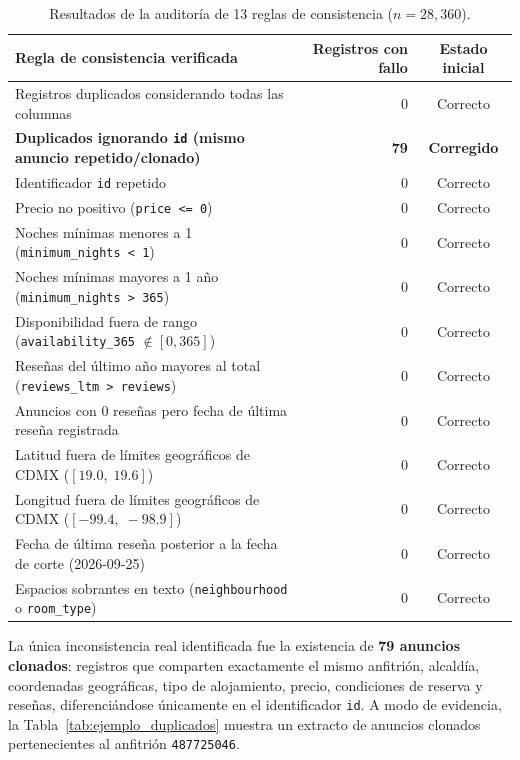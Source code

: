 \documentclass[12pt,letterpaper,oneside]{report}
\begin{document}
\begin{table}[htbp]
\centering
\caption{Resultados de la auditoría de 13 reglas de consistencia ($n = 28{,}360$).}
\label{tab:reglas_inconsistencias}
\footnotesize
\renewcommand{\arraystretch}{1.15}
\begin{tabularx}{\textwidth}{Y r c}
\toprule
{}
\textbf{Regla de consistencia verificada} & \textbf{Registros con fallo} & \textbf{Estado inicial} \\
\midrule
Registros duplicados considerando todas las columnas & 0 & Correcto \\
\textbf{Duplicados ignorando \texttt{id} (mismo anuncio repetido/clonado)} & \textbf{79} & \textbf{Corregido} \\
Identificador \texttt{id} repetido & 0 & Correcto \\
Precio no positivo (\texttt{price <= 0}) & 0 & Correcto \\
Noches mínimas menores a 1 (\texttt{minimum\_nights < 1}) & 0 & Correcto \\
Noches mínimas mayores a 1 año (\texttt{minimum\_nights > 365}) & 0 & Correcto \\
Disponibilidad fuera de rango (\texttt{availability\_365} $\notin [0, 365]$) & 0 & Correcto \\
Reseñas del último año mayores al total (\texttt{reviews\_ltm > reviews}) & 0 & Correcto \\
Anuncios con 0 reseñas pero fecha de última reseña registrada & 0 & Correcto \\
Latitud fuera de límites geográficos de CDMX ($[19.0,\; 19.6]$) & 0 & Correcto \\
Longitud fuera de límites geográficos de CDMX ($[-99.4,\; -98.9]$) & 0 & Correcto \\
Fecha de última reseña posterior a la fecha de corte (2026-09-25) & 0 & Correcto \\
Espacios sobrantes en texto (\texttt{neighbourhood} o \texttt{room\_type}) & 0 & Correcto \\
\bottomrule
\end{tabularx}
\end{table}

La única inconsistencia real identificada fue la existencia de \textbf{79 anuncios clonados}: registros que comparten exactamente el mismo anfitrión, alcaldía, coordenadas geográficas, tipo de alojamiento, precio, condiciones de reserva y reseñas, diferenciándose únicamente en el identificador \texttt{id}. A modo de evidencia, la Tabla~\ref{tab:ejemplo_duplicados} muestra un extracto de anuncios clonados pertenecientes al anfitrión \texttt{487725046}.
\end{document}
